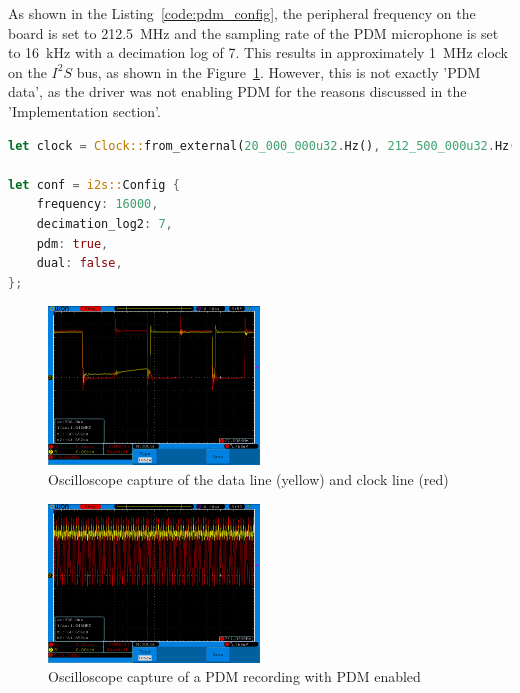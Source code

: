 As shown in the Listing~\ref{code:pdm_config}, the peripheral frequency on the board is set to \SI{212.5}{\mega\hertz}
and the sampling rate of the PDM microphone is set to \SI{16}{\kilo\hertz} with a decimation log of 7.
This results in approximately \SI{1}{\mega\hertz} clock on the $I^2S$ bus, as shown in the Figure~\ref{fig:i2s_capture}.
However, this is not exactly 'PDM data', as the driver was not enabling PDM for the reasons discussed in the 'Implementation section'.

\begin{minipage}{\textwidth}
\begin{lstlisting}[style=colorEX,language=Rust,caption={Configuration of the board clock and the PDM driver},label={code:pdm_config}]
let clock = Clock::from_external(20_000_000u32.Hz(), 212_500_000u32.Hz());

let conf = i2s::Config {
    frequency: 16000,
    decimation_log2: 7,
    pdm: true,
    dual: false,
};
\end{lstlisting}
\end{minipage}

\begin{figure}[H]
    \begin{center}
        \includegraphics[width=0.5\textwidth]{figures/i2s_capture.png}
    \end{center}
    \caption[Oscilloscope capture of the data line (yellow) and clock line (red) of the microphone]{Oscilloscope capture of the data line (yellow) and clock line (red)}
    \label{fig:i2s_capture}
\end{figure}

\begin{figure}[H]
    \begin{center}
        \includegraphics[width=0.5\textwidth]{figures/pdm_broken.png}
    \end{center}
    \caption[Oscilloscope capture of a PDM recording with PDM enabled]{Oscilloscope capture of a PDM recording with PDM enabled}
    \label{fig:pdm_no_config}
\end{figure}


